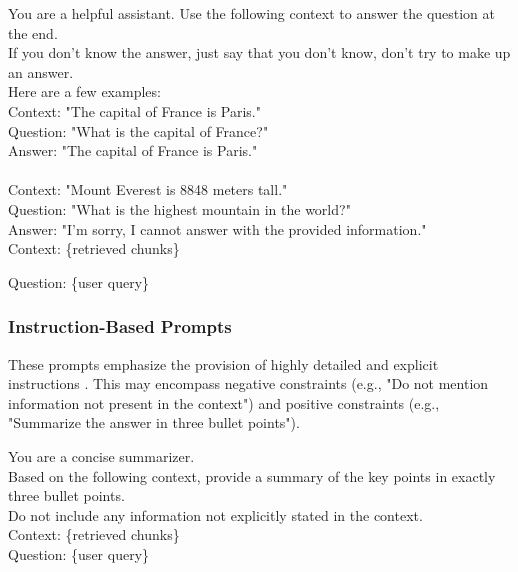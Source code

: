 \begin{tcolorbox}[promptbox,title=Example: Few Shot Prompting]
You are a helpful assistant. Use the following context to answer the question at the end.\\
If you don't know the answer, just say that you don't know, don't try to make up an answer.\\

Here are a few examples:\\

Context: "The capital of France is Paris."\\
Question: "What is the capital of France?"\\
Answer: "The capital of France is Paris."\\\\
Context: "Mount Everest is 8848 meters tall."\\
Question: "What is the highest mountain in the world?"\\
Answer: "I'm sorry, I cannot answer with the provided information."\\

Context: \{retrieved chunks\}

Question: \{user query\}
\end{tcolorbox}
    
\subsubsection{Instruction-Based Prompts}
These prompts emphasize the provision of highly detailed and explicit instructions \autocite{zhang2025instructiontuninglargelanguage}. This may encompass negative constraints (e.g., "Do not mention information not present in the context") and positive constraints (e.g., "Summarize the answer in three bullet points").

\begin{tcolorbox}[promptbox,title=Example: Instruction-Based Prompt]
You are a concise summarizer.\\
Based on the following context, provide a summary of the key points in exactly three bullet points.\\
Do not include any information not explicitly stated in the context.\\

Context: \{retrieved chunks\}\\

Question: \{user query\}
\end{tcolorbox}
    
